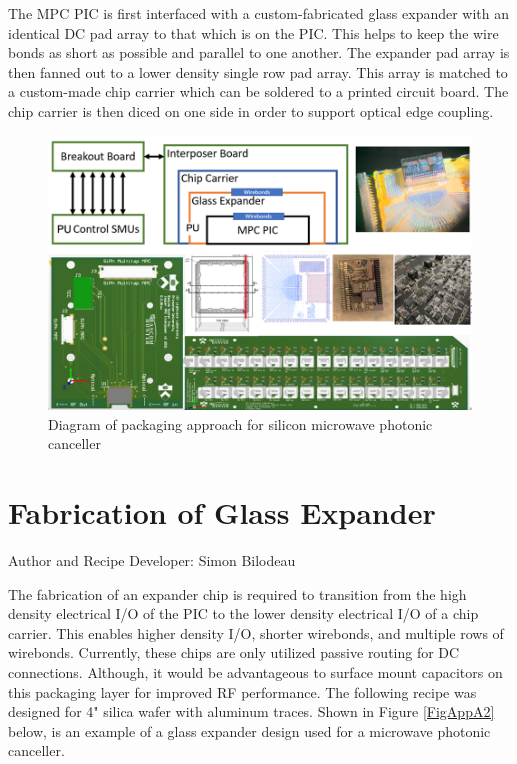 \qquad The MPC PIC is first interfaced with a custom-fabricated glass expander with an identical DC pad array to that which is on the PIC. This helps to keep the wire bonds as short as possible and parallel to one another. The expander pad array is then fanned out to a lower density single row pad array. This array is matched to a custom-made chip carrier which can be soldered to a printed circuit board. The chip carrier is then diced on one side in order to support optical edge coupling. 

\begin{figure}[!ht]
\centering
\includegraphics[width=5in]{./Figures/AppendixA/FigAppA01}
\caption{Diagram of packaging approach for silicon microwave photonic canceller}
\label{FigAppA1}
\end{figure}

\section{Fabrication of Glass Expander}
Author and Recipe Developer: Simon Bilodeau

\qquad The fabrication of an expander chip is required to transition from the high density electrical I/O of the PIC to the lower density electrical I/O of a chip carrier. This enables higher density I/O, shorter wirebonds, and multiple rows of wirebonds. Currently, these chips are only utilized passive routing for DC connections. Although, it would be advantageous to surface mount capacitors on this packaging layer for improved RF performance. The following recipe was designed for 4" silica wafer with aluminum traces. Shown in Figure \ref{FigAppA2} below, is an example of a glass expander design used for a microwave photonic canceller. 

